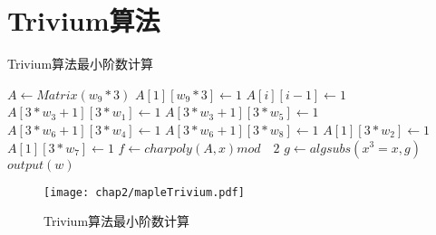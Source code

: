 
\chapter{Trivium算法}
\label{chap:Trivium}

\begin{algorithm}
	\caption{Trivium算法最小阶数计算}
	\label{algo:trivium_maple}
	\begin{algorithmic}
		
											\STATE $A \leftarrow Matrix(w_{9}*3)$
											\STATE $A[1][w_{9}*3] \leftarrow 1$
												\STATE $A[i][i - 1] \leftarrow 1$
											\ENDFOR	
											\STATE $A[3*w_{3}+1][3*w_{1}] \leftarrow 1$
											\STATE $A[3*w_{3}+1][3*w_{5}] \leftarrow 1$
											\STATE $A[3*w_{6}+1][3*w_{4}] \leftarrow 1$
											\STATE $A[3*w_{6}+1][3*w_{8}] \leftarrow 1$
											\STATE $A[1][3*w_{2}] \leftarrow 1$
											\STATE $A[1][3*w_{7}] \leftarrow 1$
											\STATE $f \leftarrow charpoly(A, x) mod \quad 2$
												\STATE $g \leftarrow algsubs(x^{3}=x, g)$
													\STATE $output(w)$
												\ENDIF
											\ENDIF
										\ENDFOR
									\ENDFOR
								\ENDFOR
							\ENDFOR
						\ENDFOR
					\ENDFOR
				\ENDFOR
			\ENDFOR
		\ENDFOR
		
	\end{algorithmic}
\end{algorithm}

\begin{figure}[!htp]
	\centering
	\texttt{[image: chap2/mapleTrivium.pdf]}
	\caption{Trivium算法最小阶数计算}\label{fig:trivium_maple}
\end{figure}
